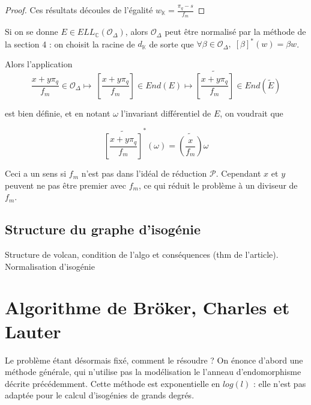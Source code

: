 \documentclass{article}
\newcommand{\C}[0]{\mathbb{C}}
\newcommand{\K}[0]{\mathbb{K}}
\newcommand{\OR}[0]{\mathcal{O}}
\newcommand{\PR}[0]{\mathcal{P}}
\begin{document}
\begin{proof}
	Ces résultats découles de l'égalité $w_{\K} = \frac{\pi_{q} - s}{f_{m}}$
\end{proof}
	

Si on se donne $E\in ELL_{\C}(\OR_{\Delta})$, alors $\OR_{\Delta} $ peut être normalisé par la méthode de la section 4 : on choisit la racine de $d_{\K}$ de sorte que $\forall\beta\in\OR_{\Delta} ,\; [\beta]^{*}(w) = \beta w$.

Alors l'application 
\begin{equation*}
	\frac{x + y\pi_{q}}{f_{m}} \in \OR_{\Delta}\mapsto\ \left[ \frac{x + y\pi_{q}}{f_{m}}\right] \in End(E)\mapsto \widetilde{\left[ \frac{x + y\pi_{q}}{f_{m}}\right]} \in End(\tilde{E})
\end{equation*}  

est bien définie, et en notant $\omega$ l'invariant différentiel de $E$, on voudrait que

\begin{equation*}
	\widetilde{ \left[ \frac{x + y\pi_{q}}{f_{m}}\right] } ^{*} (\omega) = \widetilde{\left( \frac{x}{f_{m}}\right)} \omega
\end{equation*}

Ceci a un sens si $f_{m}$ n'est pas dans l'idéal de réduction $\PR$. Cependant $x$ et $y$ peuvent ne pas être premier avec $f_{m}$, ce qui réduit le problème à un diviseur de $f_{m}$. 










\subsection{Structure du graphe d'isogénie}

Structure de volcan, condition de l'algo et conséquences (thm de l'article). Normalisation d'isogénie
















\section{Algorithme de Bröker, Charles et Lauter}

Le problème étant désormais fixé, comment le résoudre ? On énonce d'abord une méthode générale, qui n'utilise pas la modélisation le l'anneau d’endomorphisme décrite précédemment. Cette méthode est exponentielle en $log(l)$ : elle n'est pas adaptée pour le calcul d'isogénies de grands degrés.
\end{document}
